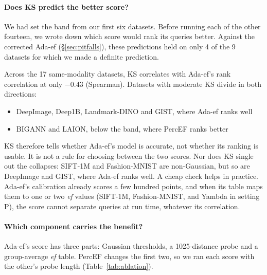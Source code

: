 \documentclass[sigconf,review=false,screen]{acmart}
\newcommand{\ef}{\textit{ef}}
\begin{document}
\paragraph{Does KS predict the better score?}\label{sec:predict}
We had set the band from our first six datasets. Before running each of the other fourteen, we wrote
down which score would rank its queries better. Against the corrected Ada-ef (\S\ref{sec:pitfalls}),
these predictions held on only 4 of the 9 datasets for which we made a definite prediction.

Across the 17 same-modality datasets, KS correlates with Ada-ef's rank correlation at only $-0.43$
(Spearman). Datasets with moderate KS divide in both directions:
\begin{itemize}
\item DeepImage, Deep1B, Landmark-DINO and GIST, where Ada-ef ranks well
\item BIGANN and LAION, below the band, where PercEF ranks better
\end{itemize}
KS therefore tells whether Ada-ef's model is accurate, not whether its ranking is usable. It is not
a rule for choosing between the two scores. Nor does KS single out the collapses: SIFT-1M and
Fashion-MNIST are non-Gaussian, but so are DeepImage and GIST, where Ada-ef ranks well. A cheap
check helps in practice. Ada-ef's calibration already scores a few hundred points, and when its
table maps them to one or two \ef{} values (SIFT-1M, Fashion-MNIST, and Yambda in setting P), the
score cannot separate queries at run time, whatever its correlation.

\paragraph{Which component carries the benefit?}\label{sec:ablation}
Ada-ef's score has three parts: Gaussian thresholds, a 1025-distance probe and a group-average \ef{}
table. PercEF changes the first two, so we ran each score with the other's probe length
(Table~\ref{tab:ablation}).
\end{document}
